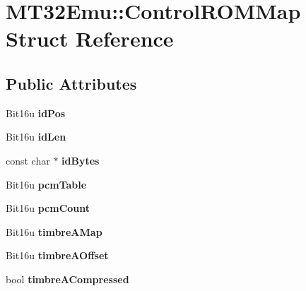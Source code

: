 \hypertarget{structMT32Emu_1_1ControlROMMap}{\section{M\-T32\-Emu\-:\-:Control\-R\-O\-M\-Map Struct Reference}
\label{structMT32Emu_1_1ControlROMMap}
}
\subsection*{Public Attributes}
\begin{DoxyCompactItemize}
\item 
\hypertarget{structMT32Emu_1_1ControlROMMap_ae1956d6d600d9ed3097c5c809c1a2d95}{Bit16u {\bfseries id\-Pos}}\label{structMT32Emu_1_1ControlROMMap_ae1956d6d600d9ed3097c5c809c1a2d95}

\item 
\hypertarget{structMT32Emu_1_1ControlROMMap_afa8ed35f7b76dd66cdcfeba604762ea6}{Bit16u {\bfseries id\-Len}}\label{structMT32Emu_1_1ControlROMMap_afa8ed35f7b76dd66cdcfeba604762ea6}

\item 
\hypertarget{structMT32Emu_1_1ControlROMMap_ab050f20b942135340043f1e646a4c3c7}{const char $\ast$ {\bfseries id\-Bytes}}\label{structMT32Emu_1_1ControlROMMap_ab050f20b942135340043f1e646a4c3c7}

\item 
\hypertarget{structMT32Emu_1_1ControlROMMap_a06013742d2a71e00cea320696b979622}{Bit16u {\bfseries pcm\-Table}}\label{structMT32Emu_1_1ControlROMMap_a06013742d2a71e00cea320696b979622}

\item 
\hypertarget{structMT32Emu_1_1ControlROMMap_a755f0151fb345356b13e027030327887}{Bit16u {\bfseries pcm\-Count}}\label{structMT32Emu_1_1ControlROMMap_a755f0151fb345356b13e027030327887}

\item 
\hypertarget{structMT32Emu_1_1ControlROMMap_acb8d35d81da2c147812fb23ae21fab59}{Bit16u {\bfseries timbre\-A\-Map}}\label{structMT32Emu_1_1ControlROMMap_acb8d35d81da2c147812fb23ae21fab59}

\item 
\hypertarget{structMT32Emu_1_1ControlROMMap_a360bfe509b76091a73db4de0b7f76582}{Bit16u {\bfseries timbre\-A\-Offset}}\label{structMT32Emu_1_1ControlROMMap_a360bfe509b76091a73db4de0b7f76582}

\item 
\hypertarget{structMT32Emu_1_1ControlROMMap_afbe7d0319d8044a37e076231f9772e66}{bool {\bfseries timbre\-A\-Compressed}}\label{structMT32Emu_1_1ControlROMMap_afbe7d0319d8044a37e076231f9772e66}


\end{DoxyCompactItemize}
